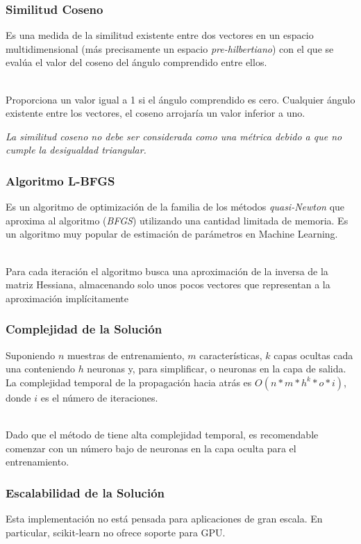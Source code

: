 \documentclass{beamer}
\begin{document}
    \begin{frame}
        \frametitle{Similitud Coseno}

        \hspace*{20pt}Es una medida de la similitud existente entre dos vectores en un espacio multidimensional 
        (más precisamente un espacio \textit{pre-hilbertiano}) con el que se evalúa el valor del coseno del ángulo comprendido 
        entre ellos.\\~\

        \hspace*{20pt}Proporciona un valor igual a 1 si el ángulo comprendido es cero. Cualquier ángulo existente entre los vectores, 
        el coseno arrojaría un valor inferior a uno.

        \hspace*{20pt}\textit{\scriptsize{La similitud coseno no debe ser considerada como una métrica debido a que no cumple la desigualdad triangular.}}
    \end{frame}

    \begin{frame}
        \frametitle{Algoritmo L-BFGS}

        \hspace*{20pt}Es un algoritmo de optimización de la familia de los métodos \textit{quasi-Newton} que aproxima al algoritmo 
        (\textit{BFGS}) utilizando una cantidad limitada de memoria. Es un algoritmo muy popular de estimación de parámetros en Machine Learning.\\~\

        \hspace*{20pt}Para cada iteración el algoritmo busca una aproximación de la inversa de la matriz Hessiana, almacenando solo unos pocos
        vectores que representan a la aproximación implícitamente

    \end{frame}

    \begin{frame}
        \frametitle{Complejidad de la Solución}

        \hspace*{20pt}Suponiendo $n$ muestras de entrenamiento, $m$ características, $k$ capas ocultas cada una conteniendo $h$ 
        neuronas y, para simplificar, o neuronas en la capa de salida. La complejidad temporal de la propagación hacia atrás es 
        $O(n*m*h^k*o*i)$, donde $i$ es el número de iteraciones. \\~\
        
        \hspace*{20pt}Dado que el método de  tiene alta complejidad temporal, es recomendable comenzar con un número 
        bajo de neuronas en la capa oculta para el entrenamiento.

    \end{frame}  

    \begin{frame}
        \frametitle{Escalabilidad de la Solución}

        \hspace*{20pt}Esta implementación no está pensada para aplicaciones de gran escala. 
        En particular, scikit-learn no ofrece soporte para GPU.


    \end{frame}  
\end{document}
